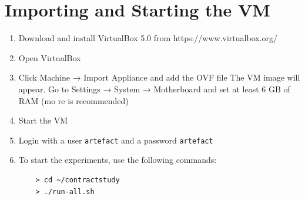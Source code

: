 \documentclass[a4paper,UKenglish]{darts}
\begin{document}





%

\appendix

\section{Importing and Starting the VM}

\begin{enumerate}
	\item Download and install VirtualBox 5.0 from https://www.virtualbox.org/
	\item Open VirtualBox
	\item Click Machine → Import Appliance and add the OVF file
	The VM image will appear. Go to  Settings → System → Motherboard and set at least 6 GB of RAM (mo re is recommended)
	\item Start the VM 
	\item Login with a user \texttt{artefact} and a password \texttt{artefact}
	\item To start the experiments, use the following commands:
	\begin{verbatim} 
	> cd ~/contractstudy
	> ./run-all.sh
	\end{verbatim} 
\end{enumerate}
\end{document}
